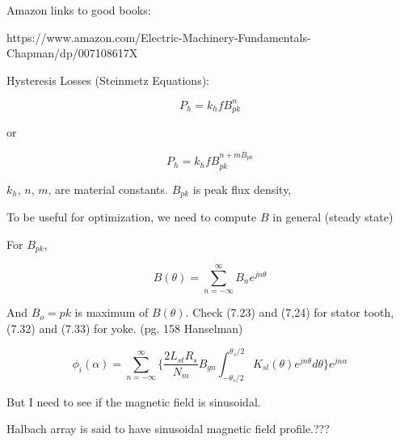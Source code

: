 \documentclass[10pt]{article}
\begin{document}
Amazon links to good books:

https://www.amazon.com/Electric-Machinery-Fundamentals-Chapman/dp/007108617X

Hysteresis Losses (Steinmetz Equations):

\begin{equation}
P_h = k_hfB_{pk}^n
\end{equation}

or 

\begin{equation}
P_h = k_hfB_{pk}^{n+mB_{pk}}
\end{equation}

$k_h$, $n$, $m$, are material constants. $B_{pk}$ is peak flux density,

To be useful for optimization, we need to compute $B$ in general (steady state)

For $B_{pk}$,

\begin{equation}
B(\theta) = \sum_{n=-\infty}^{\infty}B_ne^{jn\theta}
\end{equation}

And $B_o={pk}$ is maximum of $B(\theta)$. Check (7.23) and (7,24) for stator tooth, (7.32) and (7.33) for yoke. (pg. 158 Hanselman)

\begin{equation}
\phi_i(\alpha) = \sum_{n=-\infty}^{\infty}\bigg\{\frac{2L_{st}R_s}{N_m}B_{gn}\int_{-\theta_s/2}^{\theta_s/2}K_{sl}(\theta)e^{jn\theta}d\theta{}\bigg\}e^{jn\alpha}
\end{equation}

But I need to see if the magnetic field is sinusoidal.

Halbach array is said to have sinusoidal magnetic field profile.???
\end{document}

